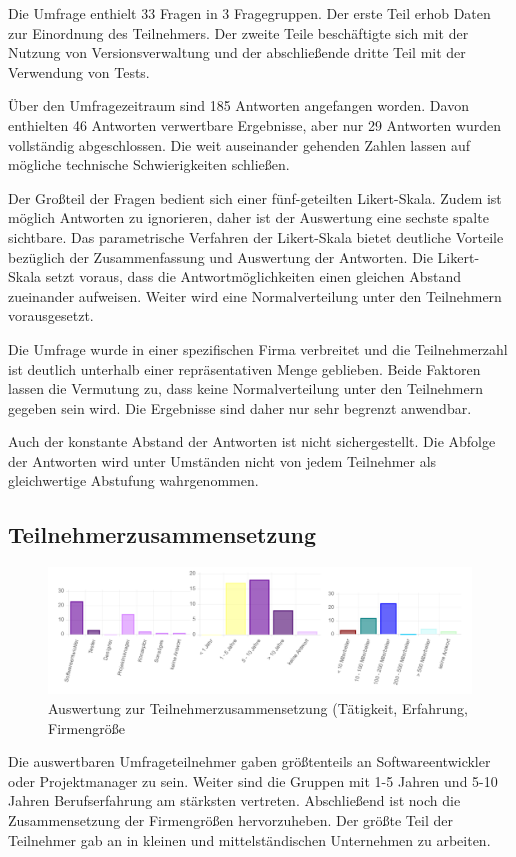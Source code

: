 Die Umfrage enthielt 33 Fragen in 3 Fragegruppen. Der erste Teil erhob Daten zur Einordnung des Teilnehmers. Der zweite Teile beschäftigte sich mit der Nutzung von Versionsverwaltung und der abschließende dritte Teil mit der Verwendung von Tests.

Über den Umfragezeitraum sind 185 Antworten angefangen worden. Davon enthielten 46 Antworten verwertbare Ergebnisse, aber nur 29 Antworten wurden vollständig abgeschlossen. Die weit auseinander gehenden Zahlen lassen auf mögliche technische Schwierigkeiten schließen.

Der Großteil der Fragen bedient sich einer fünf-geteilten Likert-Skala. Zudem ist möglich Antworten zu ignorieren, daher ist der Auswertung eine sechste spalte sichtbare. Das parametrische Verfahren  der Likert-Skala bietet deutliche Vorteile bezüglich der Zusammenfassung und Auswertung der Antworten. Die Likert-Skala setzt voraus, dass die Antwortmöglichkeiten einen gleichen Abstand zueinander aufweisen. Weiter wird eine Normalverteilung unter den Teilnehmern vorausgesetzt. 

Die Umfrage wurde in einer spezifischen Firma verbreitet und die Teilnehmerzahl ist deutlich unterhalb einer repräsentativen Menge geblieben. Beide Faktoren lassen die Vermutung zu, dass keine Normalverteilung unter den Teilnehmern gegeben sein wird. Die Ergebnisse sind daher nur sehr begrenzt anwendbar.

Auch der konstante Abstand der Antworten ist nicht sichergestellt. Die Abfolge der Antworten wird unter Umständen nicht von jedem Teilnehmer als gleichwertige Abstufung wahrgenommen.

\subsection{Teilnehmerzusammensetzung}

\begin{figure}[htbp]
  \includegraphics[width=\textwidth, height=\textheight, keepaspectratio]
    {resources/survey-participants.pdf}
  \caption{Auswertung zur Teilnehmerzusammensetzung (Tätigkeit, Erfahrung, Firmengröße}
\end{figure}
Die auswertbaren Umfrageteilnehmer gaben größtenteils an Softwareentwickler oder Projektmanager zu sein. Weiter sind die Gruppen mit 1-5 Jahren und 5-10 Jahren Berufserfahrung am stärksten vertreten. Abschließend ist noch die Zusammensetzung der Firmengrößen hervorzuheben. Der größte Teil der Teilnehmer gab an in kleinen und mittelständischen Unternehmen zu arbeiten.

